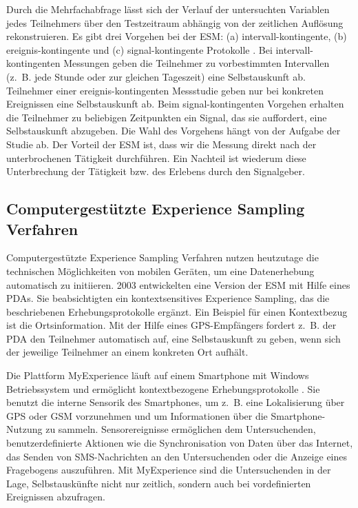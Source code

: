 Durch die Mehrfachabfrage lässt sich der Verlauf der untersuchten Variablen jedes Teilnehmers über den Testzeitraum abhängig von der zeitlichen Auflösung rekonstruieren. Es gibt drei Vorgehen bei der \ac{ESM}: (a) intervall-kontingente, (b) ereignis-kontingente und (c) signal-kontingente Protokolle \citep[][S.~198ff.]{Reis2000}. Bei intervall-kontingenten Messungen geben die Teilnehmer zu vorbestimmten Intervallen (z.~B. jede Stunde oder zur gleichen Tageszeit) eine Selbstauskunft ab. Teilnehmer einer ereignis-kontingenten Messstudie geben nur bei konkreten Ereignissen eine Selbstauskunft ab. Beim signal-kontingenten Vorgehen erhalten die Teilnehmer zu beliebigen Zeitpunkten ein Signal, das sie auffordert, eine Selbstauskunft abzugeben. Die Wahl des Vorgehens hängt von der Aufgabe der Studie ab. Der Vorteil der \ac{ESM} ist, dass wir die Messung direkt nach der unterbrochenen Tätigkeit durchführen. Ein Nachteil ist wiederum diese Unterbrechung der Tätigkeit bzw. des Erlebens durch den Signalgeber.


\subsection{Computergestützte Experience Sampling Verfahren} %
\label{sub:computergestutzte_experience_sampling_verfahren}

Computergestützte Experience Sampling Verfahren nutzen heutzutage die technischen Möglichkeiten von mobilen Geräten, um eine Datenerhebung automatisch zu initiieren. 2003 entwickelten \citet{Intille2003} eine Version der \ac{ESM} mit Hilfe eines \acs{PDA}s. Sie beabsichtigten ein kontextsensitives Experience Sampling, das die beschriebenen Erhebungsprotokolle ergänzt. Ein Beispiel für einen Kontextbezug ist die Ortsinformation. Mit der Hilfe eines \acs{GPS}-Empfängers fordert z.~B. der \acs{PDA} den Teilnehmer automatisch auf, eine Selbstauskunft zu geben, wenn sich der jeweilige Teilnehmer an einem konkreten Ort aufhält.

Die Plattform MyExperience läuft auf einem Smartphone mit Windows Betriebssystem und ermöglicht kontextbezogene Erhebungsprotokolle \citep{Froehlich2007}. Sie benutzt die interne Sensorik des Smartphones, um z.~B. eine Lokalisierung über \acs{GPS} oder \acs{GSM} vorzunehmen und um Informationen über die Smartphone-Nutzung zu sammeln. Sensorereignisse ermöglichen dem Untersuchenden, benutzerdefinierte Aktionen wie die Synchronisation von Daten über das Internet, das Senden von \acs{SMS}-Nachrichten an den Untersuchenden oder die Anzeige eines Fragebogens auszuführen. Mit MyExperience sind die Untersuchenden in der Lage, Selbstauskünfte nicht nur zeitlich, sondern auch bei vordefinierten Ereignissen abzufragen.

